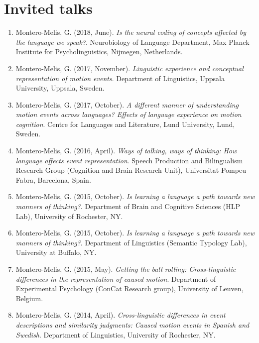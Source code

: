 \documentclass[margin, 11pt]{res} %
\begin{document}
\begin{resume}
\begin{enumerate}
\end{enumerate}



\section{\sc Invited talks}

\begin{enumerate}

\item Montero-Melis, G. (2018, June). \textit{Is the neural coding of concepts affected by the language we speak?}. Neurobiology of Language Department, Max Planck Institute for Psycholinguistics, Nijmegen, Netherlands.

\item Montero-Melis, G. (2017, November). \textit{Linguistic experience and conceptual representation of motion events}. Department of Linguistics, Uppsala University, Uppsala, Sweden.

\item Montero-Melis, G. (2017, October). \textit{A different manner of understanding motion events across languages? Effects of language experience on motion cognition}. Centre for Languages and Literature, Lund University, Lund, Sweden.

\item Montero-Melis, G. (2016, April). \textit{Ways of talking, ways of thinking: How language affects event representation}. Speech Production and Bilingualism Research Group (Cognition and Brain Research Unit), Universitat Pompeu Fabra, Barcelona, Spain.

\item Montero-Melis, G. (2015, October). \textit{Is learning a language a path towards new manners of thinking?}. Department of Brain and Cognitive Sciences (HLP Lab), University of Rochester, NY.

\item Montero-Melis, G. (2015, October). \textit{Is learning a language a path towards new manners of thinking?}. Department of Linguistics (Semantic Typology Lab), University at Buffalo, NY.

\item Montero-Melis, G. (2015, May). \textit{Getting the ball rolling: Cross-linguistic differences in the representation of caused motion}. Department of Experimental Psychology (ConCat Research group), University of Leuven, Belgium.

\item Montero-Melis, G. (2014, April). \textit{Cross-linguistic differences in event descriptions and similarity judgments: Caused motion events in Spanish and Swedish}. Department of Linguistics, University of Rochester, NY.


\end{enumerate}
\end{resume}
\end{document}
